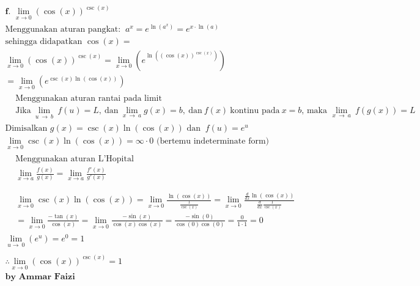 \documentclass[12pt]{article}
\begin{document}
\begin{fleqn}[1em]
\begin{align*}
\boxed{
\begin{aligned}
  & \textbf{f. } \lim_{x \to 0} (\cos(x))^{\csc(x)} \\
  & \boxed{\text{Menggunakan aturan pangkat: } \:a^x=e^{\ln \left(a^x\right)}=e^{x\cdot \ln \left(a\right)}} \\
  & \text{sehingga didapatkan } \cos(x) =  \\
  & \lim_{x \to 0} (\cos(x))^{\csc(x)} = \lim_{x \to 0} \left(e^{\ln\left(\left(\cos(x)\right)^{\csc(x)}\right)}\right) \\
  & = \lim_{x \to 0} \left(e^{\csc(x) \ln(\cos(x))}\right) \\
  & \boxed{
    \begin{aligned}
      & \text{Menggunakan aturan rantai pada limit } \\
      & \mathrm{Jika}\:\lim _{u\:\to \:b}\:f\left(u\right)=L,\:\mathrm{dan}\:\lim _{x\:\to \:a}g\left(x\right)=b,\:\mathrm{dan}\:f\left(x\right)\:\text{kontinu pada}\:x=b \text{, maka } \lim _{x\:\to \:a}\:f\left(g\left(x\right)\right)=L
    \end{aligned}
  } \\
  & \text{Dimisalkan } g\left(x\right)=\csc \left(x\right)\ln \left(\cos \left(x\right)\right)\text{ dan }\:f\left(u\right)=e^u \\
  & \lim_{x \to 0} \csc \left(x\right)\ln \left(\cos \left(x\right)\right) = \infty \cdot 0 \text{ (bertemu indeterminate form)} \\
  & \boxed{
    \begin{aligned}
      & \text{Menggunakan aturan L'Hopital} \\
      & \lim_{x \to a} \frac{f(x)}{g(x)} = \lim_{x \to a} \frac{f'(x)}{g'(x)} \\
    \end{aligned}
  } \\
  & \boxed{
    \begin{aligned}
    & \lim_{x \to 0} \csc \left(x\right)\ln \left(\cos \left(x\right)\right) = \lim_{x \to 0} \frac{\ln \left(\cos \left(x\right)\right)}{\frac{1}{\csc \left(x\right)}}
      = \lim_{x \to 0} \frac{\frac{d}{dx} \ln \left(\cos \left(x\right)\right)}{\frac{d}{dx}\frac{1}{\csc \left(x\right)}} \\
    & = \lim_{x \to 0} \frac{-\tan(x)}{\cos(x)} = \lim_{x \to 0} \frac{-\sin(x)}{\cos(x)\cos(x)}
      = \frac{-\sin(0)}{\cos(0) \cos(0)} = \frac{0}{1 \cdot 1} = 0
    \end{aligned}
  } \\
  & \lim _{u\to \:0}\left(e^u\right) = e^0 = 1 \\ ~ \\
  & \boxed{\therefore \lim_{x \to 0} (\cos(x))^{\csc(x)} = 1}
  \\ & \textbf{by Ammar Faizi}
\end{aligned}
}
\end{align*}


\end{fleqn}
\end{document}

